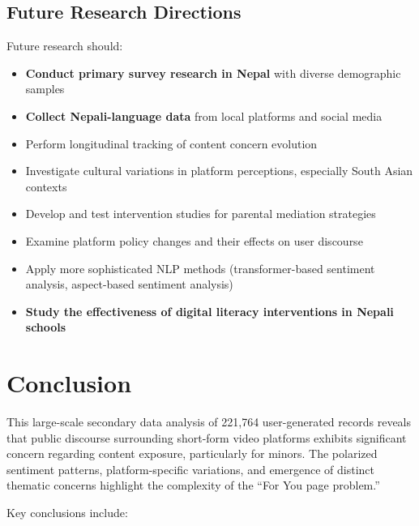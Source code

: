 \documentclass[11pt,a4paper]{article}
\begin{document}
\subsection{Future Research Directions}

Future research should:

\begin{itemize}[leftmargin=*, itemsep=0.3em]
    \item \textbf{Conduct primary survey research in Nepal} with diverse demographic samples
    \item \textbf{Collect Nepali-language data} from local platforms and social media
    \item Perform longitudinal tracking of content concern evolution
    \item Investigate cultural variations in platform perceptions, especially South Asian contexts
    \item Develop and test intervention studies for parental mediation strategies
    \item Examine platform policy changes and their effects on user discourse
    \item Apply more sophisticated NLP methods (transformer-based sentiment analysis, aspect-based sentiment analysis)
    \item \textbf{Study the effectiveness of digital literacy interventions in Nepali schools}
\end{itemize}

\section{Conclusion}

This large-scale secondary data analysis of 221,764 user-generated records reveals that public discourse surrounding short-form video platforms exhibits significant concern regarding content exposure, particularly for minors. The polarized sentiment patterns, platform-specific variations, and emergence of distinct thematic concerns highlight the complexity of the ``For You page problem.''

Key conclusions include:
\end{document}
